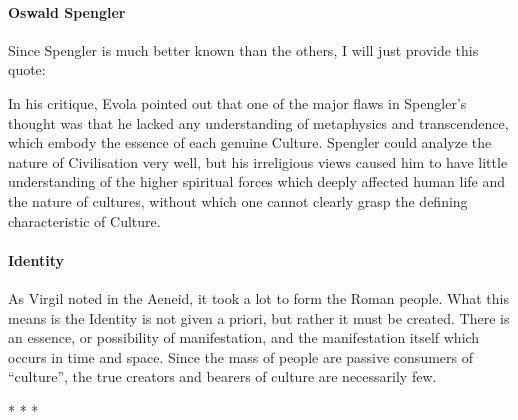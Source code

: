 \paragraph{Oswald Spengler}
Since Spengler is much better known than the others, I will just provide this quote:

\begin{quotex}
In his critique, Evola pointed out that one of the major flaws in Spengler's thought was that he lacked any
understanding of metaphysics and transcendence, which embody the essence of each genuine Culture. Spengler could
analyze the nature of Civilisation very well, but his irreligious views caused him to have little understanding of the
higher spiritual forces which deeply affected human life and the nature of cultures, without which one cannot clearly
grasp the defining characteristic of Culture. 

\end{quotex}
\paragraph{Identity}
As Virgil noted in the Aeneid, it took a lot to form the Roman people. What this means is the Identity is not given a
priori, but rather it must be created. There is an essence, or possibility of manifestation, and the manifestation
itself which occurs in time and space. Since the mass of people are passive consumers of “culture”, the true creators
and bearers of culture are necessarily few.


\begin{center}* * *\end{center}

